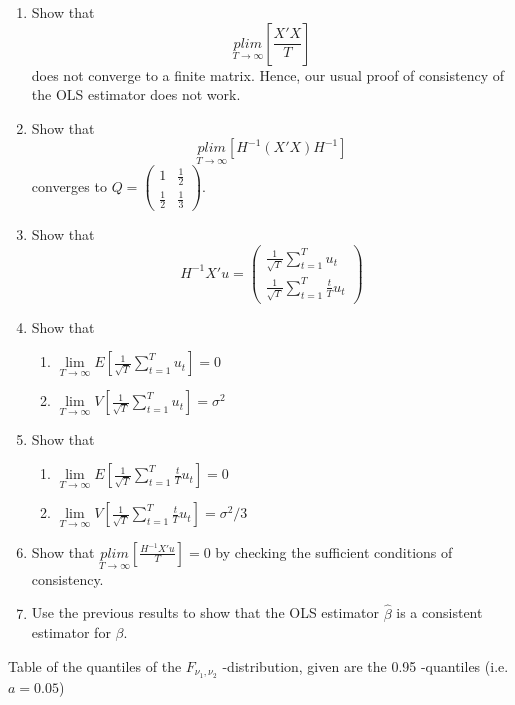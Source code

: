 \documentclass{article}
\begin{document}
\begin{enumerate}[label=(\alph*)]
\item Show that $$\underset{T\rightarrow \infty}{plim} \left[\frac{X'X}{T}\right]$$ does not converge to a finite matrix. Hence, our usual proof of consistency of the OLS estimator does not work.
\item Show that $$\underset{T\rightarrow \infty}{plim} \left[H^{-1}(X'X) H^{-1} \right]$$ converges to $Q = \begin{pmatrix} 1 & \frac{1}{2} \\ \frac{1}{2} & \frac{1}{3}\end{pmatrix}$.
\item Show that $$H^{-1} X'u = \begin{pmatrix} \frac{1}{\sqrt{T}}\sum_{t=1}^{T}u_t \\ \frac{1}{\sqrt{T}}\sum_{t=1}^{T}\frac{t}{T}u_t\end{pmatrix}$$
\item Show that 
\begin{enumerate}[label=(\roman*)]
\item $\lim\limits_{T\rightarrow \infty}E \left[\frac{1}{\sqrt{T}}\sum_{t=1}^{T}u_t\right] = 0$
\item $\lim\limits_{T\rightarrow \infty}V\left[\frac{1}{\sqrt{T}}\sum_{t=1}^{T}u_t\right] = \sigma^2$
\end{enumerate}
\item Show that
\begin{enumerate}[label=(\roman*)]
\item $\lim\limits_{T\rightarrow \infty}E \left[\frac{1}{\sqrt{T}}\sum_{t=1}^{T}\frac{t}{T}u_t\right] = 0$
\item $\lim\limits_{T\rightarrow \infty}V\left[\frac{1}{\sqrt{T}}\sum_{t=1}^{T}\frac{t}{T}u_t\right] = \sigma^2/3$
\end{enumerate}

\item Show that $\underset{T\rightarrow \infty}{plim}\left[\frac{H^{-1}X'u}{T}\right] = 0$ by checking the sufficient conditions of consistency.
\item Use the previous results to show that the OLS estimator $\hat{\beta}$ is a consistent estimator for $\beta$.
\end{enumerate}



\newpage Table of the quantiles of the $F_{\nu _{1},\nu _{2}}$%
-distribution,	given are the 0.95 -quantiles (i.e. $a=0.05$)
\end{document}
